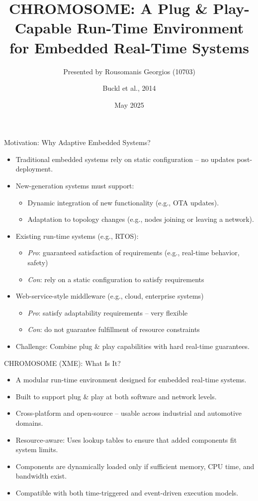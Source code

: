 \documentclass{beamer}
\subtitle{Presented by Rousomanis Georgios (10703)}
\title[CHROMOSOME RTE]{CHROMOSOME: A Plug \& Play-Capable Run-Time Environment for Embedded Real-Time Systems}
\author{Buckl et al., 2014}
\institute{fortiss GmbH \& Technische Universität München}
\date{May 2025}
\begin{document}
\begin{frame}
  \titlepage
\end{frame}

\begin{frame}{Motivation: Why Adaptive Embedded Systems?}
  \begin{itemize}
    \item Traditional embedded systems rely on static configuration -- no updates post-deployment.
    \item New-generation systems must support:
    \begin{itemize}
      \item Dynamic integration of new functionality (e.g., OTA updates).
      \item Adaptation to topology changes (e.g., nodes joining or leaving a network).
    \end{itemize}
    \item Existing run-time systems (e.g., RTOS):
    \begin{itemize}
        \item \textit{Pro}: guaranteed satisfaction of requirements (e.g., real-time behavior, safety)
        \item \textit{Con}: rely on a static configuration to satisfy requirements
    \end{itemize}
    \item Web-service-style middleware (e.g., cloud, enterprise systems)
    \begin{itemize}
        \item \textit{Pro}: satisfy adaptability requirements -- very flexible
        \item \textit{Con}: do not guarantee fulfillment of resource constraints
    \end{itemize}
    \item Challenge: Combine plug \& play capabilities with hard real-time guarantees.
  \end{itemize}
\end{frame}

\begin{frame}{CHROMOSOME (XME): What Is It?}
  \begin{itemize}
    \item A modular run-time environment designed for embedded real-time systems.
    \item Built to support plug \& play at both software and network levels.
    \item Cross-platform and open-source -- usable across industrial and automotive domains.
    \item Resource-aware: Uses lookup tables to ensure that added components fit system limits.
    \item Components are dynamically loaded only if sufficient memory, CPU time, and bandwidth exist.
    \item Compatible with both time-triggered and event-driven execution models.
  \end{itemize}
\end{frame}
\end{document}
